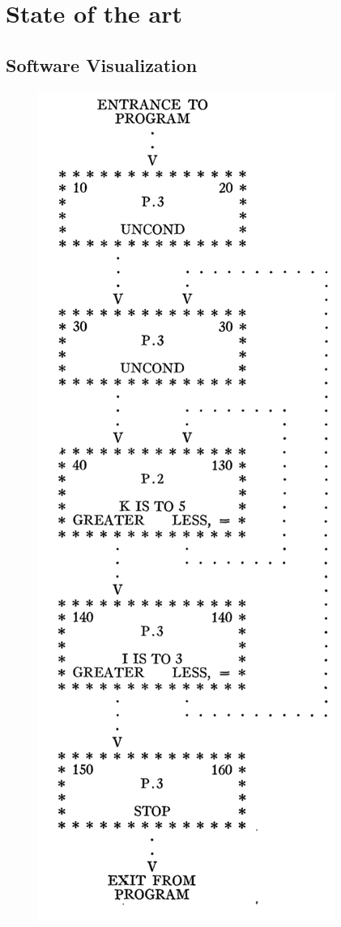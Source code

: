 
\chapter[State of the art]{State of the art}
\graphicspath{ {images/stateOfArt} }



\section{Software Visualization}


\begin{figure}
  \centering
  \includegraphics[width=0.9\linewidth]{Haibt1959_Flowchart.png} 

\end{figure}
